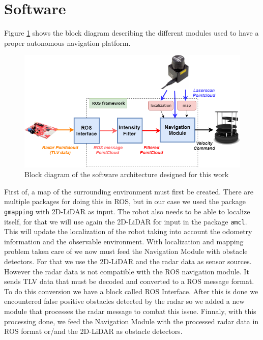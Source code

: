 \section{Software}
Figure \ref{fig::softsetup} shows the block diagram describing  the different modules used to have a proper autonomous navigation platform.
\begin{figure}[h] 
\centerline{\includegraphics [width=0.9 \textwidth]{imgs/chapter4/bd.png}}
\caption{Block diagram of the software architecture designed for this work}
\label{fig::softsetup}
\end{figure}

First of, a map of the surrounding  environment must first be created.  There are multiple packages for doing this in \ac{ROS}, but in our case we used the package \texttt{gmapping} with 2D-\ac{LiDAR} as input. The robot also needs to be able to localize itself, for that we will use again the 2D-\ac{LiDAR} for input in the package \texttt{amcl}. This will update the localization of the robot taking into account the odometry information and the observable environment. With localization and mapping problem taken care of we now must feed the Navigation Module with obstacle detectors. For that we use the 2D-LiDAR and the radar data as sensor sources.
 However the radar data is not compatible with the \ac{ROS} navigation module. It sends \ac{TLV} data that must be decoded and converted to a \ac{ROS} message format. To do this conversion we have a block called \ac{ROS} Interface. After this is done we encountered false positive obstacles detected by the radar so we added a new module that processes the radar message to combat this issue. Finnaly, with this processing done, we feed the Navigation Module with the processed radar data in \ac{ROS} format or/and the 2D-\ac{LiDAR} as obstacle detectors. 

